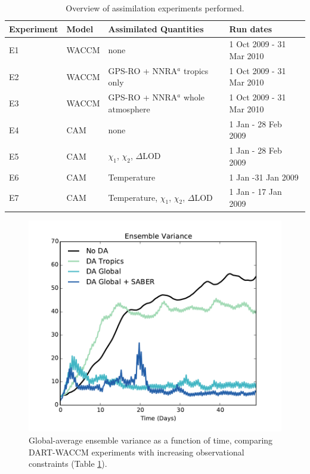 \begin{table}
\caption{Overview of assimilation experiments performed.}
\centering
\begin{tabular}{p{2cm}p{2cm}p{6cm}p{4cm}}
	Experiment& Model &  Assimilated Quantities  & Run dates \\
\hline
E1 & WACCM &	none   & 1 Oct 2009 - 31 Mar 2010	\\
E2 & WACCM &	GPS-RO + NNRA$^a$ tropics only & 1 Oct 2009 - 31 Mar 2010	\\
E3 & WACCM &	GPS-RO + NNRA$^a$ whole atmosphere  & 1 Oct 2009 - 31 Mar 2010	\\
E4 & CAM	&	none &  1 Jan - 28 Feb 2009 \\
E5 & CAM &	$\chi_1$, $\chi_2$, $\Delta$LOD	& 1 Jan - 28 Feb 2009 \\
E6 & CAM &	Temperature	& 1 Jan -31 Jan 2009	\\
E7 & CAM &	Temperature, $\chi_1$, $\chi_2$, $\Delta$LOD	& 1 Jan - 17 Jan 2009\\
\hline
\end{tabular}
\label{tab:expts}
\end{table}
\clearpage

 \begin{figure}
	 \includegraphics[width=\textwidth]{Paper_figures/ERPDA_paper_evalvariable_state_space.pdf}
	 \caption{Global-average ensemble variance as a function of time, comparing DART-WACCM experiments with increasing observational constraints (Table \ref{tab:expts}).}
	 \label{fig:evalvariable_state}
\end{figure}


